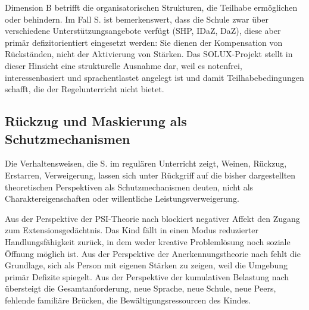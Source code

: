 \documentclass[ngerman, a4paper]{article}
\begin{document}
Dimension B betrifft die organisatorischen Strukturen, die Teilhabe ermöglichen oder
behindern. Im Fall S. ist bemerkenswert, dass die Schule zwar über verschiedene
Unterstützungsangebote verfügt (SHP, IDaZ, DaZ), diese aber primär
defizitorientiert eingesetzt werden: Sie dienen der Kompensation von Rückständen,
nicht der Aktivierung von Stärken. Das SOLUX-Projekt stellt in dieser Hinsicht
eine strukturelle Ausnahme dar, weil es notenfrei, interessenbasiert und
sprachentlastet angelegt ist und damit Teilhabebedingungen schafft, die der
Regelunterricht nicht bietet.

\subsection{Rückzug und Maskierung als Schutzmechanismen}

Die Verhaltensweisen, die S. im regulären Unterricht zeigt, Weinen, Rückzug, Erstarren,
Verweigerung, lassen sich unter Rückgriff auf die bisher dargestellten theoretischen
Perspektiven als Schutzmechanismen deuten, nicht als Charaktereigenschaften oder
willentliche Leistungsverweigerung.

Aus der Perspektive der PSI-Theorie nach \textcite[S.\,35--57]{kuhl2019diversitaet} blockiert negativer Affekt den Zugang zum
Extensionsgedächtnis. Das Kind fällt in einen Modus reduzierter Handlungsfähigkeit
zurück, in dem weder kreative Problemlösung noch soziale Öffnung möglich ist. Aus der
Perspektive der Anerkennungstheorie nach \textcite{grossrieder2010anerkennung} fehlt die Grundlage, sich als Person
mit eigenen Stärken zu zeigen, weil die Umgebung primär Defizite spiegelt. Aus der
Perspektive der kumulativen Belastung nach \textcite[S.\,86--98]{behrensen2019inklusive} übersteigt die Gesamtanforderung,
neue Sprache, neue Schule, neue Peers, fehlende familiäre Brücken, die
Bewältigungsressourcen des Kindes.
\end{document}
